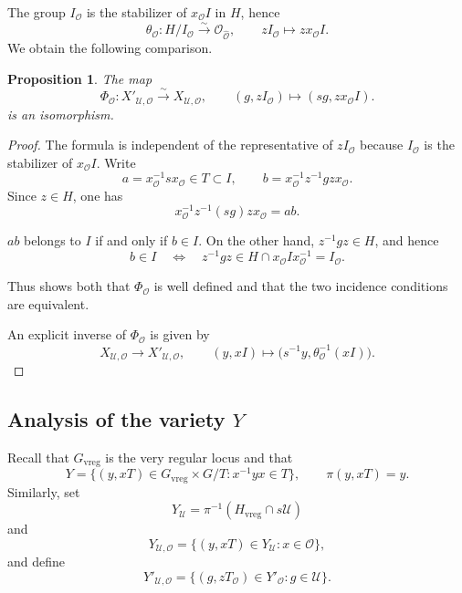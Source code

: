 \documentclass[11pt,letterpaper]{amsart}
\newtheorem{proposition}[theorem]{Proposition}
\theoremstyle{definition}
\numberwithin{equation}{section}
\numberwithin{theorem}{section}
\begin{document}
The group \(I_{\mathcal O}\) is the stabilizer of
\(x_{\mathcal O}I\) in \(H\), hence
\[
\theta_{\mathcal O}:H/I_{\mathcal O}\xrightarrow{\sim}
\mathscr O_{\widehat{\mathcal O}},
\qquad zI_{\mathcal O}\longmapsto zx_{\mathcal O}I.
\]
We obtain the following comparison.
\begin{proposition}\label{Xloc}
The map
\begin{equation}
\Phi_{\mathcal O}:X'_{\mathcal U,\mathcal O}
 \xrightarrow{\sim}X_{\mathcal U,{\mathcal O}},
\qquad
(g,zI_{\mathcal O})\longmapsto
(sg,zx_{\mathcal O}I).                               
\end{equation}
is an isomorphism.
\end{proposition}

\begin{proof}
The formula is independent of the representative of \(zI_{\mathcal O}\)
because \(I_{\mathcal O}\) is the stabilizer of
\(x_{\mathcal O}I\). Write
\[
a=x_{\mathcal O}^{-1}sx_{\mathcal O}\in T\subset I,
\qquad
b=x_{\mathcal O}^{-1}z^{-1}gzx_{\mathcal O}.
\]
Since \(z\in H\), one has
\[
x_{\mathcal O}^{-1}z^{-1}(sg)zx_{\mathcal O}=ab.    
\]

$ab$ belongs to \(I\) if and only if
\(b\in I\). On the other hand, \(z^{-1}gz\in H\), and hence
\begin{equation}
b\in I
\quad\Longleftrightarrow\quad
z^{-1}gz\in H\cap x_{\mathcal O}Ix_{\mathcal O}^{-1}
 =I_{\mathcal O}.\label{inc}
\end{equation}

Thus  shows both that
\(\Phi_{\mathcal O}\) is well
defined and that the two incidence conditions are equivalent.

An explicit inverse of $\Phi_{\mathcal O}$ is given by
\[
X_{\mathcal U,{\mathcal O}}\longrightarrow
X'_{\mathcal U,\mathcal O},
\qquad
(y,xI)\longmapsto
\bigl(s^{-1}y,\theta_{\mathcal O}^{-1}(xI)\bigr).   
\]
\end{proof}

\subsection{Analysis of the variety $Y$}
Recall that \(G_{\mathrm{vreg}}\) is the very regular locus and that
\[
  Y
 =\{(y,xT)\in G_{\mathrm{vreg}}\times G/T:x^{-1}yx\in T\},
 \qquad \pi(y,xT)=y.
\]
Similarly, set
\[
Y_{\mathcal U}=\pi^{-1}(H_{\mathrm{vreg}}\cap s\mathcal{U})
\]
and
\[
Y_{\mathcal U,\mathcal O}
=\{(y,xT)\in Y_{\mathcal U}:x\in\mathcal O\},
\]
and define
\[
Y'_{\mathcal U,\mathcal O}
=\{(g,zT_{\mathcal O})\in Y'_{\mathcal O}:g\in\mathcal U\}.
\]
   
\end{document}
